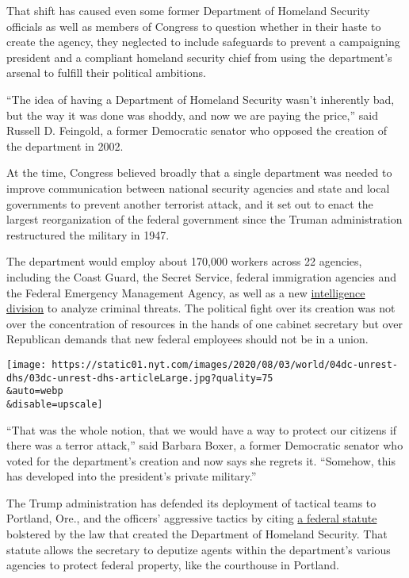 That shift has caused even some former Department of Homeland Security
officials as well as members of Congress to question whether in their
haste to create the agency, they neglected to include safeguards to
prevent a campaigning president and a compliant homeland security chief
from using the department's arsenal to fulfill their political
ambitions.

``The idea of having a Department of Homeland Security wasn't inherently
bad, but the way it was done was shoddy, and now we are paying the
price,'' said Russell D. Feingold, a former Democratic senator who
opposed the creation of the department in 2002.

At the time, Congress believed broadly that a single department was
needed to improve communication between national security agencies and
state and local governments to prevent another terrorist attack, and it
set out to enact the largest reorganization of the federal government
since the Truman administration restructured the military in 1947.

The department would employ about 170,000 workers across 22 agencies,
including the Coast Guard, the Secret Service, federal immigration
agencies and the Federal Emergency Management Agency, as well as a new
\href{https://www.nytimes.com/2020/08/01/us/politics/brian-murphy-homeland-security-protesters.html}{intelligence
division} to analyze criminal threats. The political fight over its
creation was not over the concentration of resources in the hands of one
cabinet secretary but over Republican demands that new federal employees
should not be in a union.

\texttt{[image: https://static01.nyt.com/images/2020/08/03/world/04dc-unrest-dhs/03dc-unrest-dhs-articleLarge.jpg?quality=75\\\&auto=webp\\\&disable=upscale]}

``That was the whole notion, that we would have a way to protect our
citizens if there was a terror attack,'' said Barbara Boxer, a former
Democratic senator who voted for the department's creation and now says
she regrets it. ``Somehow, this has developed into the president's
private military.''

The Trump administration has defended its deployment of tactical teams
to Portland, Ore., and the officers' aggressive tactics by citing
\href{https://www.law.cornell.edu/uscode/text/40/1315}{a federal
statute} bolstered by the law that created the Department of Homeland
Security. That statute allows the secretary to deputize agents within
the department's various agencies to protect federal property, like the
courthouse in Portland.

